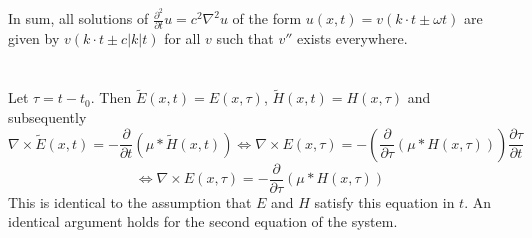 \documentclass{article}
\begin{document}
In sum, all solutions of $\frac{\partial^2}{\partial t}u=c^2\nabla^2 u$ of the form $u(x,t)=v(k\cdot t\pm \omega t)$ are given by $v(k\cdot t\pm c|k|t)$ for all $v$ such that $v''$ exists everywhere.

\section{}
Let $\tau = t-t_0$. Then $\tilde{E}(x,t)=E(x,\tau)$, $\tilde{H}(x,t)=H(x,\tau)$ and subsequently
\[\nabla \times \tilde{E}(x,t) = -\frac{\partial}{\partial t}(\mu*\tilde{H}(x,t)) \Leftrightarrow \nabla\times E(x,\tau)=-\left( \frac{\partial}{\partial\tau}(\mu*H(x,\tau))\right)\frac{\partial\tau}{\partial t}\]
\[\Leftrightarrow \nabla \times E(x,\tau)=-\frac{\partial}{\partial\tau}(\mu*H(x,\tau))\]
This is identical to the assumption that $E$ and $H$ satisfy this equation in $t$.
An identical argument holds for the second equation of the system.
\end{document}
